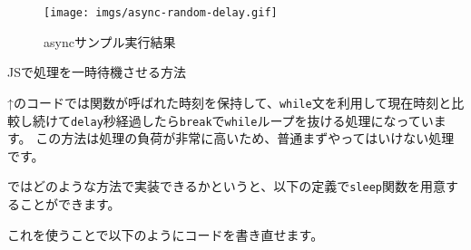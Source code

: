 \begin{figure}
\centering
\texttt{[image: imgs/async-random-delay.gif]}
\caption{asyncサンプル実行結果}
\end{figure}

JSで処理を一時待機させる方法

↑のコードでは関数が呼ばれた時刻を保持して、\texttt{while}文を利用して現在時刻と比較し続けて\texttt{delay}秒経過したら\texttt{break}で\texttt{while}ループを抜ける処理になっています。
この方法は処理の負荷が非常に高いため、普通まずやってはいけない処理です。

ではどのような方法で実装できるかというと、以下の定義で\texttt{sleep}関数を用意することができます。

\begin{Shaded}
\begin{Highlighting}[]
  \OperatorTok{=}\KeywordTok{=\textgreater{}}  \KeywordTok{=\textgreater{}} \OperatorTok{,}\OperatorTok{;}
\end{Highlighting}
\end{Shaded}

これを使うことで以下のようにコードを書き直せます。

\begin{Shaded}
\begin{Highlighting}[]
    \NormalTok{ () \{}
    \OperatorTok{=} \NormalTok{(}\NormalTok{() }\OperatorTok{*} \NormalTok{)}\OperatorTok{;}
     \OperatorTok{;}
    \OperatorTok{\%}  \OperatorTok{===} \NormalTok{) \{}
       \VerbatimStringTok{\textasciigrave{}}\SpecialCharTok{$\{}\SpecialCharTok{\}}\OperatorTok{;}
\NormalTok{    \} }\NormalTok{ \{}
       \NormalTok{(}\VerbatimStringTok{\textasciigrave{}}\SpecialCharTok{$\{}\SpecialCharTok{\}}\NormalTok{)}\OperatorTok{;}
\NormalTok{    \}}
\NormalTok{  \}}

  \NormalTok{ \{}
    \NormalTok{(} \NormalTok{())}\OperatorTok{;}
\NormalTok{  \} }
    \OperatorTok{;}
\NormalTok{  \}}
\end{Highlighting}
\end{Shaded}

